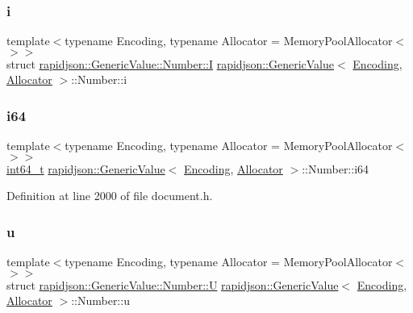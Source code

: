 \subsubsection{\texorpdfstring{i}{i}}
{\footnotesize\ttfamily template$<$typename Encoding, typename Allocator = Memory\+Pool\+Allocator$<$$>$$>$ \\
struct \mbox{\hyperlink{structrapidjson_1_1_generic_value_1_1_number_1_1_i}{rapidjson\+::\+Generic\+Value\+::\+Number\+::I}} \mbox{\hyperlink{classrapidjson_1_1_generic_value}{rapidjson\+::\+Generic\+Value}}$<$ \mbox{\hyperlink{classrapidjson_1_1_encoding}{Encoding}}, \mbox{\hyperlink{classrapidjson_1_1_allocator}{Allocator}} $>$\+::Number\+::i}

\mbox{\label{unionrapidjson_1_1_generic_value_1_1_number_a976fe64dee40a548ecc394c56da0d293}} 
\subsubsection{\texorpdfstring{i64}{i64}}
{\footnotesize\ttfamily template$<$typename Encoding, typename Allocator = Memory\+Pool\+Allocator$<$$>$$>$ \\
\mbox{\hyperlink{stdint_8h_a414156feea104f8f75b4ed9e3121b2f6}{int64\+\_\+t}} \mbox{\hyperlink{classrapidjson_1_1_generic_value}{rapidjson\+::\+Generic\+Value}}$<$ \mbox{\hyperlink{classrapidjson_1_1_encoding}{Encoding}}, \mbox{\hyperlink{classrapidjson_1_1_allocator}{Allocator}} $>$\+::Number\+::i64}



Definition at line 2000 of file document.\+h.

\mbox{\label{unionrapidjson_1_1_generic_value_1_1_number_ae5996c0c17bcc7e833ab283b446cc55d}} 
\subsubsection{\texorpdfstring{u}{u}}
{\footnotesize\ttfamily template$<$typename Encoding, typename Allocator = Memory\+Pool\+Allocator$<$$>$$>$ \\
struct \mbox{\hyperlink{structrapidjson_1_1_generic_value_1_1_number_1_1_u}{rapidjson\+::\+Generic\+Value\+::\+Number\+::U}} \mbox{\hyperlink{classrapidjson_1_1_generic_value}{rapidjson\+::\+Generic\+Value}}$<$ \mbox{\hyperlink{classrapidjson_1_1_encoding}{Encoding}}, \mbox{\hyperlink{classrapidjson_1_1_allocator}{Allocator}} $>$\+::Number\+::u}

